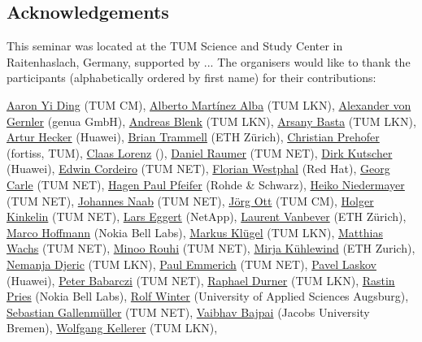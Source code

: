 \subsection*{Acknowledgements}\label{sec:acknowledgement}

This seminar was located at the TUM Science and Study Center in Raitenhaslach,
Germany, supported by ...  The organisers would like to thank the participants
(alphabetically ordered by first name) for their contributions:

\href{}{Aaron Yi Ding} (TUM CM),
\href{}{Alberto Martínez Alba} (TUM LKN),
\href{}{Alexander von Gernler} (genua GmbH),
\href{}{Andreas Blenk} (TUM LKN),
\href{}{Arsany Basta} (TUM LKN),
\href{}{Artur Hecker} (Huawei),
\href{}{Brian Trammell} (ETH Zürich),
\href{}{Christian Prehofer} (fortiss, TUM),
\href{}{Claas Lorenz} (),
\href{}{Daniel Raumer} (TUM NET),
\href{}{Dirk Kutscher} (Huawei),
\href{}{Edwin Cordeiro} (TUM NET),
\href{}{Florian Westphal} (Red Hat),
\href{}{Georg Carle} (TUM NET),
\href{}{Hagen Paul Pfeifer} (Rohde \& Schwarz),
\href{}{Heiko Niedermayer} (TUM NET),
\href{}{Johannes Naab} (TUM NET),
\href{}{Jörg Ott} (TUM CM),
\href{}{Holger Kinkelin} (TUM NET),
\href{}{Lars Eggert} (NetApp),
\href{}{Laurent Vanbever} (ETH Zürich),
\href{}{Marco Hoffmann} (Nokia Bell Labs),
\href{}{Markus Klügel} (TUM LKN),
\href{}{Matthias Wachs} (TUM NET),
\href{}{Minoo Rouhi} (TUM NET),
\href{}{Mirja Kühlewind} (ETH Zurich),
\href{}{Nemanja Djeric} (TUM LKN),
\href{}{Paul Emmerich} (TUM NET),
\href{}{Pavel Laskov} (Huawei),
\href{}{Peter Babarczi} (TUM NET),
\href{}{Raphael Durner} (TUM LKN),
\href{}{Rastin Pries} (Nokia Bell Labs),
\href{}{Rolf Winter} (University of Applied Sciences Augsburg),
\href{}{Sebastian Gallenmüller} (TUM NET),
\href{}{Vaibhav Bajpai} (Jacobs University Bremen),
\href{}{Wolfgang Kellerer} (TUM LKN),

\vfill\eject

